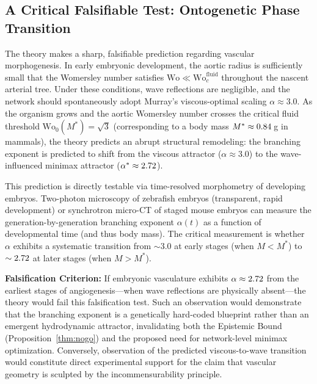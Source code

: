 \subsection{A Critical Falsifiable Test: Ontogenetic Phase Transition}

The theory makes a sharp, falsifiable prediction regarding vascular
morphogenesis. In early embryonic development, the aortic radius is sufficiently
small that the Womersley number satisfies $\mathrm{Wo} \ll
\mathrm{Wo}_c^{\mathrm{fluid}}$ throughout the nascent arterial tree. Under
these conditions, wave reflections are negligible, and the network should
spontaneously adopt Murray's viscous-optimal scaling $\alpha \approx 3.0$. As
the organism grows and the aortic Womersley number crosses the critical fluid
threshold $\mathrm{Wo}_0(M^*) = \sqrt{3}$ (corresponding to a body mass $M^*
\approx 0.84\,$g in mammals), the theory predicts an abrupt structural
remodeling: the branching exponent is predicted to shift from the viscous
attractor ($\alpha \approx 3.0$) to the wave-influenced minimax attractor
($\alpha^* \approx 2.72$).

This prediction is directly testable via time-resolved morphometry of developing
embryos. Two-photon microscopy of zebrafish embryos (transparent, rapid
development) or synchrotron micro-CT of staged mouse embryos can measure the
generation-by-generation branching exponent $\alpha(t)$ as a function of
developmental time (and thus body mass). The critical measurement is whether
$\alpha$ exhibits a systematic transition from $\sim 3.0$ at early stages (when
$M < M^*$) to $\sim 2.72$ at later stages (when $M > M^*$).

\textbf{Falsification Criterion:} If embryonic vasculature exhibits $\alpha
\approx 2.72$ from the earliest stages of angiogenesis---when wave
reflections are physically absent---the theory would fail this
falsification test. Such an observation would demonstrate that the branching
exponent is a genetically hard-coded blueprint rather than an emergent
hydrodynamic attractor, invalidating both the Epistemic Bound
(Proposition~\ref{thm:nogo}) and the proposed need for network-level minimax
optimization. Conversely, observation of the predicted viscous-to-wave
transition would constitute direct experimental support for the claim that
vascular geometry is sculpted by the incommensurability principle.

